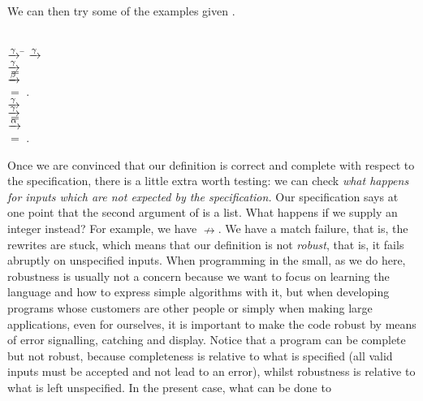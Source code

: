 \noindent We can then try some of the examples given
.
\begin{tabbing}
\\
 \= \(\xrightarrow{\smash{\gamma}}\) \=\kill 
\> \(\xrightarrow{\smash{\gamma}}\) \> \\
\> \(\xrightarrow{\smash{\gamma}}\) \> \\
\> \(=\) \> \\
\> \(\xrightarrow{\smash{\beta}}\) \> \\
\> \(=\) \> \erlcode{[4,[1,2],[],4]}.\\
\> \(\xrightarrow{\smash{\gamma}}\) \> \\
\> \(\xrightarrow{\smash{\gamma}}\) \> \\
\> \(=\) \> \erlcode{[3,[]|rm\_fst([5,2],[])]}\\
\> \(\xrightarrow{\smash{\alpha}}\) \> \erlcode{[3,[]|[]]}\\
\> \(=\) \> \erlcode{[3,[]]}.
\end{tabbing}
Once we are convinced that our definition is correct and
complete with respect to the specification, there is a little extra
worth testing: we can check \emph{what happens for inputs which are
  not expected by the specification.} Our specification says at one
point that the second argument of  is a list. What
happens if we supply an integer instead? For example, we have
 \(\nrightarrow\). We have a match failure,
that is, the rewrites are stuck, which means that our definition is
not \emph{robust}, that is, it fails abruptly on unspecified
inputs. When programming in the small, as we do here, robustness is
usually not a concern because we want to focus on learning the
language and how to express simple algorithms with it, but when
developing programs whose customers are other people or simply when
making large applications, even for ourselves, it is important to make
the code robust by means of error signalling, catching and
display. Notice that a program can be complete but not robust, because
completeness is relative to what is specified (all valid inputs must
be accepted and not lead to an error), whilst robustness is relative
to what is left unspecified. In the present case, what can be done to
